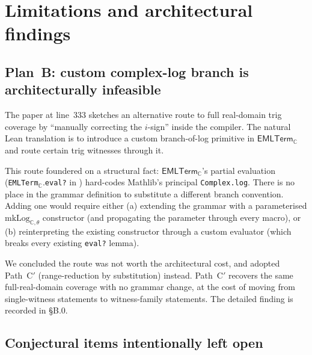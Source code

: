 \documentclass[11pt,a4paper]{article}
\theoremstyle{plain}
\theoremstyle{definition}
\newcommand{\C}{\mathbb{C}}
\newcommand{\EMLTC}{\mathsf{EMLTerm}_\C}
\begin{document}
\section{Limitations and architectural findings}\label{sec:limits}

\subsection{Plan~B: custom complex-log branch is architecturally
infeasible}

The paper at line~333 sketches an alternative route to full real-domain
trig coverage by ``manually correcting the $i$-sign'' inside the
compiler. The natural Lean translation is to introduce a custom
branch-of-log primitive in $\EMLTC$ and route certain trig witnesses
through it.

This route foundered on a structural fact: $\EMLTC$'s partial
evaluation (\texttt{EMLTerm}$_\C$.\texttt{eval?} in
) hard-codes Mathlib's principal
\texttt{Complex.log}. There is no place in the grammar definition
to substitute a different branch convention. Adding one would require
either (a) extending the grammar with a parameterised
$\mathrm{mkLog}_{\C, \theta}$ constructor (and propagating the
parameter through every macro), or (b) reinterpreting the existing
constructor through a custom evaluator (which breaks every existing
\texttt{eval?} lemma).

We concluded the route was not worth the architectural cost, and
adopted Path~C$'$ (range-reduction by substitution) instead. Path~C$'$
recovers the same full-real-domain coverage with no grammar change,
at the cost of moving from single-witness statements to
witness-family statements. The detailed finding is recorded in
 §B.0.

\subsection{Conjectural items intentionally left open}
\end{document}
